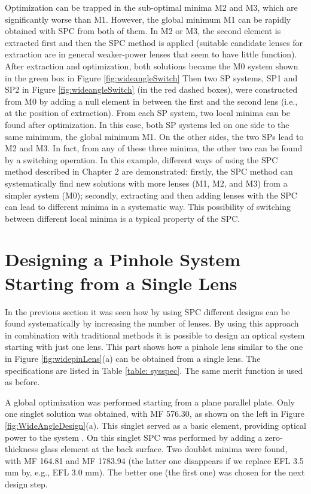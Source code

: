 Optimization can be trapped in the sub-optimal minima M2 and M3, which are significantly worse than M1. However, the global minimum M1 can be rapidly obtained with SPC from both of them. In M2 or M3, the second element is extracted first and then the SPC method is applied (suitable candidate lenses for extraction are in general weaker-power lenses that seem to have little function). After extraction and optimization, both solutions became the M0 system shown in the green box in Figure \ref{fig:wideangleSwitch} Then two SP systems, SP1 and SP2 in Figure \ref{fig:wideangleSwitch} (in the red dashed boxes), were constructed from M0 by adding a null element in between the first and the second lens (i.e., at the position of extraction). From each SP system, two local minima can be found after optimization. In this case, both SP systems led on one side to the same minimum, the global minimum M1. On the other sides, the two SPs lead to M2 and M3. In fact, from any of these three minima, the other two can be found by a switching operation. In this example, different ways of using the SPC method described in Chapter 2 are demonstrated: firstly, the SPC method can systematically find new solutions with more lenses (M1, M2, and M3) from a simpler system (M0); secondly, extracting and then adding lenses with the SPC can lead to different minima in a systematic way. This possibility of switching between different local minima is a typical property of the SPC.
\section{Designing a Pinhole System Starting from a Single Lens} \label{chrom90d}

In the previous section it was seen how by using SPC different designs can be found systematically by increasing the number of lenses. By using this approach in combination with traditional methods it is possible to design an optical system starting with just one lens. This part shows how a pinhole lens similar to the one in Figure \ref{fig:widepinLens}(a) can be obtained from a single lens. The specifications are listed in Table \ref{table: sysspec}. The same merit function is used as before.

A global optimization was performed starting from a plane parallel plate. Only one singlet solution was obtained, with MF 576.30, as shown on the left in Figure \ref{fig:WideAngleDesign}(a). This singlet served as a basic element, providing optical power to the system \cite{LivshitsQA2013}. On this singlet SPC was performed by adding a zero-thickness glass element at the back surface. Two doublet minima were found, with MF 164.81 and MF 1783.94 (the latter one disappears if we replace EFL 3.5 mm by, e.g., EFL 3.0 mm). The better one (the first one) was chosen for the next design step. 

